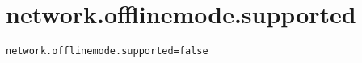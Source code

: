 \section{network.offlinemode.supported}
\label{configuration:NetworkOfflinemodeSupported}
\AvailableInJavaAndCsharp{\TODO}
\begin{lstlisting}[style=Props,caption={Usage example for \textit{network.offlinemode.supported}}]
network.offlinemode.supported=false
\end{lstlisting}